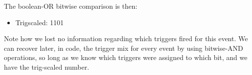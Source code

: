 The boolean-OR bitwise comparison is then:

\begin{itemize}
  \item Trigscaled: 1101
\end{itemize}

Note how we lost no information regarding which triggers fired for this event.
We can recover later, in code, the trigger mix for every event by using
bitwise-AND operations, so long as we know which triggers were assigned to which
bit, and we have the trig-scaled number.
